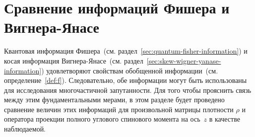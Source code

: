 \section{Сравнение информаций Фишера и Вигнера-Янасе}
\label{sec:qfi-wyi-comparison}
%
Квантовая информация Фишера~(см. раздел~\ref{sec:quantum-fisher-information})
и косая информация Вигнера-Янасе~(см. раздел~\ref{sec:skew-wigner-yanase-information})
удовлетворяют свойствам обобщенной информации~(см. определение~\ref{def:f}).
Следовательно, обе информации могут быть использованы для исследования многочастичной запутанности.
Для того чтобы прояснить связь между этим фундаментальными мерами,
в этом разделе будет проведено сравнение величин этих информаций для произвольной матрицы плотности $\rho$
и оператора проекции полного углового спинового момента на ось~$z$
в качестве наблюдаемой.

